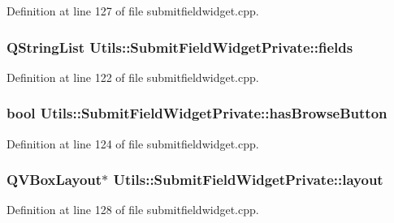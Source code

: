 Definition at line 127 of file submitfieldwidget.\-cpp.

\hypertarget{struct_utils_1_1_submit_field_widget_private_aa7af2d96737934b56cd589feca4774e7}{
\subsubsection[{fields}]{\setlength{\rightskip}{0pt plus 5cm}Q\-String\-List Utils\-::\-Submit\-Field\-Widget\-Private\-::fields}}\label{struct_utils_1_1_submit_field_widget_private_aa7af2d96737934b56cd589feca4774e7}


Definition at line 122 of file submitfieldwidget.\-cpp.

\hypertarget{struct_utils_1_1_submit_field_widget_private_a9c7298aa72b495edb1946454ce1198fa}{
\subsubsection[{has\-Browse\-Button}]{\setlength{\rightskip}{0pt plus 5cm}bool Utils\-::\-Submit\-Field\-Widget\-Private\-::has\-Browse\-Button}}\label{struct_utils_1_1_submit_field_widget_private_a9c7298aa72b495edb1946454ce1198fa}


Definition at line 124 of file submitfieldwidget.\-cpp.

\hypertarget{struct_utils_1_1_submit_field_widget_private_a82ba5b210f1399e3914cf70ed0ea88fd}{
\subsubsection[{layout}]{\setlength{\rightskip}{0pt plus 5cm}Q\-V\-Box\-Layout$\ast$ Utils\-::\-Submit\-Field\-Widget\-Private\-::layout}}\label{struct_utils_1_1_submit_field_widget_private_a82ba5b210f1399e3914cf70ed0ea88fd}


Definition at line 128 of file submitfieldwidget.\-cpp.

